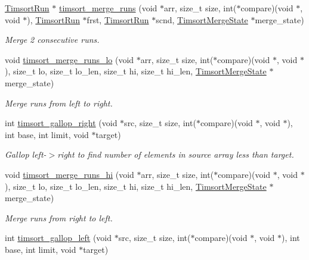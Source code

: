 \begin{DoxyCompactItemize}
\hyperlink{structTimsortRun}{Timsort\+Run} $\ast$ \hyperlink{group__Timsort_ga0be2dffcafd8880d305fd0c7d9f87fd7}{timsort\+\_\+merge\+\_\+runs} (void $\ast$arr, size\+\_\+t size, int($\ast$compare)(void $\ast$, void $\ast$), \hyperlink{structTimsortRun}{Timsort\+Run} $\ast$frst, \hyperlink{structTimsortRun}{Timsort\+Run} $\ast$scnd, \hyperlink{structTimsortMergeState}{Timsort\+Merge\+State} $\ast$merge\+\_\+state)
\begin{DoxyCompactList}\small\item\em Merge 2 consecutive runs. \end{DoxyCompactList}\item 
void \hyperlink{group__Timsort_ga18534dcb0fb5689af44c3309a44a4968}{timsort\+\_\+merge\+\_\+runs\+\_\+lo} (void $\ast$arr, size\+\_\+t size, int($\ast$compare)(void $\ast$, void $\ast$), size\+\_\+t lo, size\+\_\+t lo\+\_\+len, size\+\_\+t hi, size\+\_\+t hi\+\_\+len, \hyperlink{structTimsortMergeState}{Timsort\+Merge\+State} $\ast$merge\+\_\+state)
\begin{DoxyCompactList}\small\item\em Merge runs from left to right. \end{DoxyCompactList}\item 
int \hyperlink{group__Timsort_gaa2295bcc1b001663881a0ad6c20d6d7a}{timsort\+\_\+gallop\+\_\+right} (void $\ast$src, size\+\_\+t size, int($\ast$compare)(void $\ast$, void $\ast$), int base, int limit, void $\ast$target)
\begin{DoxyCompactList}\small\item\em Gallop left-\/$>$right to find number of elements in source array less than target. \end{DoxyCompactList}\item 
void \hyperlink{group__Timsort_ga82043845fa8abc3c91332008ddbb4b55}{timsort\+\_\+merge\+\_\+runs\+\_\+hi} (void $\ast$arr, size\+\_\+t size, int($\ast$compare)(void $\ast$, void $\ast$), size\+\_\+t lo, size\+\_\+t lo\+\_\+len, size\+\_\+t hi, size\+\_\+t hi\+\_\+len, \hyperlink{structTimsortMergeState}{Timsort\+Merge\+State} $\ast$merge\+\_\+state)
\begin{DoxyCompactList}\small\item\em Merge runs from right to left. \end{DoxyCompactList}\item 
int \hyperlink{group__Timsort_ga503a8e66f4c150e73b2b37980996cae0}{timsort\+\_\+gallop\+\_\+left} (void $\ast$src, size\+\_\+t size, int($\ast$compare)(void $\ast$, void $\ast$), int base, int limit, void $\ast$target)

\end{DoxyCompactItemize}
